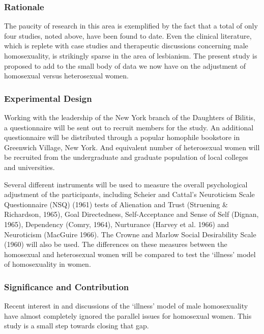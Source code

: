 \begin{refsection}
\subsubsection{Rationale}
\label{rationale}

The paucity of research in this area is exemplified by the fact that a total of only four studies, noted above, have been found to date. Even the clinical literature, which is replete with case studies and therapeutic discussions concerning male homosexuality, is strikingly sparse in the area of lesbianism. The present study is proposed to add to the small body of data we now have on the adjustment of homosexual versus heterosexual women.

\subsubsection{Experimental Design}
\label{experimentaldesign}

Working with the leadership of the New York branch of the Daughters of Bilitis, a questionnaire will be sent out to recruit members for the study. An additional questionnaire will be distributed through a popular homophile bookstore in Greenwich Village, New York. And equivalent number of heterosexual women will be recruited from the undergraduate and graduate population of local colleges and universities.

Several different instruments will be used to measure the overall psychological adjustment of the participants, including Scheier and Cattal's Neuroticism Scale Questionnaire (NSQ) (1961) tests of Alienation and Trust (Struening \& Richardson, 1965), Goal Directedness, Self-Acceptance and Sense of Self (Dignan, 1965), Dependency (Comry, 1964), Nurturance (Harvey et al. 1966) and Neuroticism (MacGuire 1966). The Crowne and Marlow Social Desirability Scale (1960) will also be used. The differences on these measures between the homosexual and heterosexual women will be compared to test the `illness' model of homosexuality in women.

\subsubsection{Significance and Contribution}
\label{significanceandcontribution}

Recent interest in and discussions of the `illness' model of male homosexuality have almost completely ignored the parallel issues for homosexual women. This study is a small step towards closing that gap.


\end{refsection}

